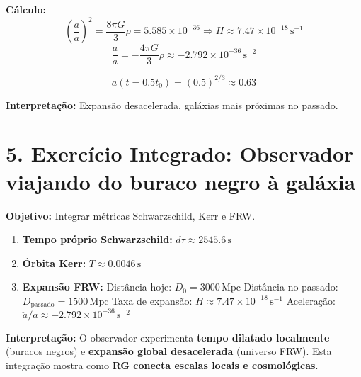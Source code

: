\documentclass[12pt]{article}
\begin{document}
\textbf{Cálculo:}  
\[
\left(\frac{\dot a}{a}\right)^2 = \frac{8 \pi G}{3} \rho = 5.585 \times 10^{-36} \Rightarrow H \approx 7.47 \times 10^{-18}\,\mathrm{s^{-1}}
\]  
\[
\frac{\ddot a}{a} = -\frac{4 \pi G}{3} \rho \approx -2.792 \times 10^{-36}\,\mathrm{s^{-2}}
\]

\[
a(t = 0.5 t_0) = (0.5)^{2/3} \approx 0.63
\]

\textbf{Interpretação:} Expansão desacelerada, galáxias mais próximas no passado.

\section*{5. Exercício Integrado: Observador viajando do buraco negro à galáxia}

\textbf{Objetivo:} Integrar métricas Schwarzschild, Kerr e FRW.

\begin{enumerate}
    \item \textbf{Tempo próprio Schwarzschild:} \(d\tau \approx 2545.6\,\mathrm{s}\)
    \item \textbf{Órbita Kerr:} \(T \approx 0.0046\,\mathrm{s}\)
    \item \textbf{Expansão FRW:}  
    Distância hoje: \(D_0 = 3000\,\mathrm{Mpc}\)  
    Distância no passado: \(D_\mathrm{passado} = 1500\,\mathrm{Mpc}\)  
    Taxa de expansão: \(H \approx 7.47 \times 10^{-18}\,\mathrm{s^{-1}}\)  
    Aceleração: \(\ddot a / a \approx -2.792 \times 10^{-36}\,\mathrm{s^{-2}}\)
\end{enumerate}

\textbf{Interpretação:}  
O observador experimenta \textbf{tempo dilatado localmente} (buracos negros) e \textbf{expansão global desacelerada} (universo FRW). Esta integração mostra como \textbf{RG conecta escalas locais e cosmológicas}.
\end{document}
